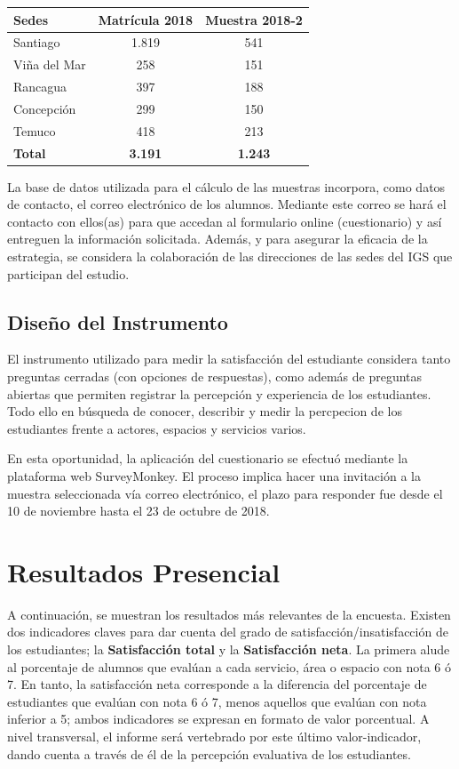 \documentclass[]{book}
\begin{document}
\begin{longtable}[]{@{}lcc@{}}
\toprule
Sedes & Matrícula 2018 & Muestra 2018-2\tabularnewline
\midrule
\endhead
Santiago & 1.819 & 541\tabularnewline
Viña del Mar & 258 & 151\tabularnewline
Rancagua & 397 & 188\tabularnewline
Concepción & 299 & 150\tabularnewline
Temuco & 418 & 213\tabularnewline
\textbf{Total} & \textbf{3.191} & \textbf{1.243}\tabularnewline
\bottomrule
\end{longtable}

La base de datos utilizada para el cálculo de las muestras incorpora,
como datos de contacto, el correo electrónico de los alumnos. Mediante
este correo se hará el contacto con ellos(as) para que accedan al
formulario online (cuestionario) y así entreguen la información
solicitada. Además, y para asegurar la eficacia de la estrategia, se
considera la colaboración de las direcciones de las sedes del IGS que
participan del estudio.

\section{Diseño del Instrumento}\label{diseno-del-instrumento}

El instrumento utilizado para medir la satisfacción del estudiante
considera tanto preguntas cerradas (con opciones de respuestas), como
además de preguntas abiertas que permiten registrar la percepción y
experiencia de los estudiantes. Todo ello en búsqueda de conocer,
describir y medir la percpecion de los estudiantes frente a actores,
espacios y servicios varios.

En esta oportunidad, la aplicación del cuestionario se efectuó mediante
la plataforma web SurveyMonkey. El proceso implica hacer una invitación
a la muestra seleccionada vía correo electrónico, el plazo para
responder fue desde el 10 de noviembre hasta el 23 de octubre de 2018.

\chapter{Resultados Presencial}\label{resultados-presencial}

A continuación, se muestran los resultados más relevantes de la
encuesta. Existen dos indicadores claves para dar cuenta del grado de
satisfacción/insatisfacción de los estudiantes; la \textbf{Satisfacción
total} y la \textbf{Satisfacción neta}. La primera alude al porcentaje
de alumnos que evalúan a cada servicio, área o espacio con nota 6 ó 7.
En tanto, la satisfacción neta corresponde a la diferencia del
porcentaje de estudiantes que evalúan con nota 6 ó 7, menos aquellos que
evalúan con nota inferior a 5; ambos indicadores se expresan en formato
de valor porcentual. A nivel transversal, el informe será vertebrado por
este último valor-indicador, dando cuenta a través de él de la
percepción evaluativa de los estudiantes.
\end{document}

